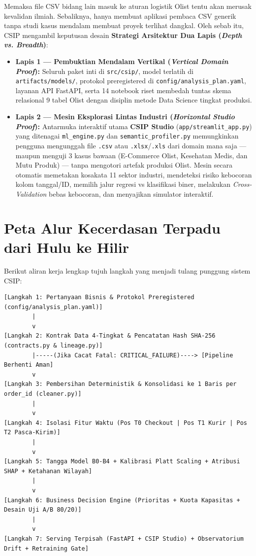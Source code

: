 \documentclass[11pt,a4paper,oneside]{book}
\newcommand{\code}[1]{{\small\nolinkurl{#1}}}
\begin{document}
Memaksa file CSV bidang lain masuk ke aturan logistik Olist tentu akan merusak kevalidan ilmiah. Sebaliknya, hanya membuat aplikasi pembaca CSV generik tanpa studi kasus mendalam membuat proyek terlihat dangkal. Oleh sebab itu, CSIP mengambil keputusan desain \textbf{Strategi Arsitektur Dua Lapis (\emph{Depth vs. Breadth})}:

\begin{itemize}
  \item \textbf{Lapis 1 --- Pembuktian Mendalam Vertikal (\emph{Vertical Domain Proof}):} Seluruh paket inti di \code{src/csip/}, model terlatih di \code{artifacts/models/}, protokol preregistered di \code{config/analysis_plan.yaml}, layanan API FastAPI, serta 14 notebook riset membedah tuntas skema relasional 9 tabel Olist dengan disiplin metode Data Science tingkat produksi.
  \item \textbf{Lapis 2 --- Mesin Eksplorasi Lintas Industri (\emph{Horizontal Studio Proof}):} Antarmuka interaktif utama \textbf{CSIP Studio} (\code{app/streamlit_app.py}) yang ditenagai \code{ml_engine.py} dan \code{semantic_profiler.py} memungkinkan pengguna mengunggah file \code{.csv} atau \code{.xlsx}/\code{.xls} dari domain mana saja --- maupun menguji 3 kasus bawaan (E-Commerce Olist, Kesehatan Medis, dan Mutu Produk) --- tanpa mengotori artefak produksi Olist. Mesin secara otomatis memetakan kosakata 11 sektor industri, mendeteksi risiko kebocoran kolom tanggal/ID, memilih jalur regresi vs klasifikasi biner, melakukan \emph{Cross-Validation} bebas kebocoran, dan menyajikan simulator interaktif.
\end{itemize}

\section{Peta Alur Kecerdasan Terpadu dari Hulu ke Hilir}

Berikut aliran kerja lengkap tujuh langkah yang menjadi tulang punggung sistem CSIP:

\begin{lstlisting}
[Langkah 1: Pertanyaan Bisnis & Protokol Preregistered (config/analysis_plan.yaml)]
        |
        v
[Langkah 2: Kontrak Data 4-Tingkat & Pencatatan Hash SHA-256 (contracts.py & lineage.py)]
        |-----(Jika Cacat Fatal: CRITICAL_FAILURE)----> [Pipeline Berhenti Aman]
        v
[Langkah 3: Pembersihan Deterministik & Konsolidasi ke 1 Baris per order_id (cleaner.py)]
        |
        v
[Langkah 4: Isolasi Fitur Waktu (Pos T0 Checkout | Pos T1 Kurir | Pos T2 Pasca-Kirim)]
        |
        v
[Langkah 5: Tangga Model B0-B4 + Kalibrasi Platt Scaling + Atribusi SHAP + Ketahanan Wilayah]
        |
        v
[Langkah 6: Business Decision Engine (Prioritas + Kuota Kapasitas + Desain Uji A/B 80/20)]
        |
        v
[Langkah 7: Serving Terpisah (FastAPI + CSIP Studio) + Observatorium Drift + Retraining Gate]
\end{lstlisting}
\end{document}
